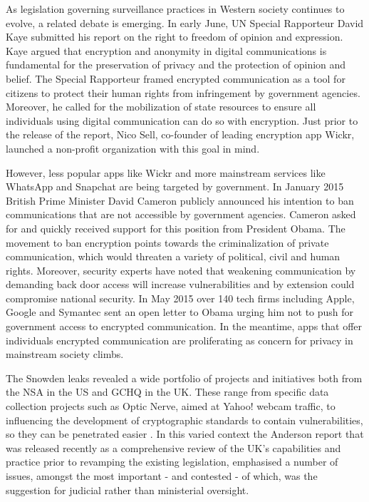 \documentclass{llncs}
\begin{document}
As legislation governing surveillance practices in Western society continues to evolve, a related debate is emerging. In early June, UN Special Rapporteur David Kaye submitted his report on the right to freedom of opinion and expression. Kaye argued that encryption and anonymity in digital communications is fundamental for the preservation of privacy and the protection of opinion and belief. The Special Rapporteur framed encrypted communication as a tool for citizens to protect their human rights from infringement by government agencies. Moreover, he called for the mobilization of state resources to ensure all individuals using digital communication can do so with encryption. Just prior to the release of the report, Nico Sell, co-founder of leading encryption app Wickr, launched a non-profit organization with this goal in mind. 

However, less popular apps like Wickr and more mainstream services like WhatsApp and Snapchat are being targeted by government. In January 2015 British Prime Minister David Cameron publicly announced his intention to ban communications that are not accessible by government agencies. Cameron asked for and quickly received support for this position from President Obama. The movement to ban encryption points towards the criminalization of private communication, which would threaten a variety of political, civil and human rights. Moreover, security experts have noted that weakening communication by demanding back door access will increase vulnerabilities and by extension could compromise national security. In May 2015 over 140 tech firms including Apple, Google and Symantec sent an open letter to Obama urging him not to push for government access to encrypted communication. In the meantime, apps that offer individuals encrypted communication are proliferating as concern for privacy in mainstream society climbs.

The Snowden leaks revealed a wide portfolio of projects and initiatives both from the NSA in the US and GCHQ in the UK. These range from specific data collection projects such as Optic Nerve, aimed at Yahoo! webcam traffic, to influencing the development of cryptographic standards to contain vulnerabilities, so they can be penetrated easier \cite{ECDH}. In this varied context the Anderson report \cite{Anderson} that was released recently as a comprehensive review of the UK's capabilities and practice prior to revamping the existing legislation, emphasised a number of issues, amongst the most important - and contested - of which, was the suggestion for judicial rather than ministerial oversight.
\end{document}

